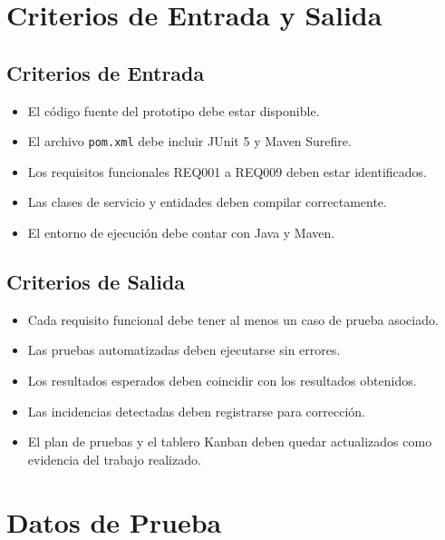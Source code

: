 \documentclass[12pt,a4paper]{article}
\begin{document}
\section{Criterios de Entrada y Salida}

\subsection{Criterios de Entrada}

\begin{itemize}[leftmargin=*]
    \item El código fuente del prototipo debe estar disponible.
    \item El archivo \texttt{pom.xml} debe incluir JUnit 5 y Maven Surefire.
    \item Los requisitos funcionales REQ001 a REQ009 deben estar identificados.
    \item Las clases de servicio y entidades deben compilar correctamente.
    \item El entorno de ejecución debe contar con Java y Maven.
\end{itemize}

\subsection{Criterios de Salida}

\begin{itemize}[leftmargin=*]
    \item Cada requisito funcional debe tener al menos un caso de prueba asociado.
    \item Las pruebas automatizadas deben ejecutarse sin errores.
    \item Los resultados esperados deben coincidir con los resultados obtenidos.
    \item Las incidencias detectadas deben registrarse para corrección.
    \item El plan de pruebas y el tablero Kanban deben quedar actualizados como evidencia del trabajo realizado.
\end{itemize}

\section{Datos de Prueba}
\end{document}

